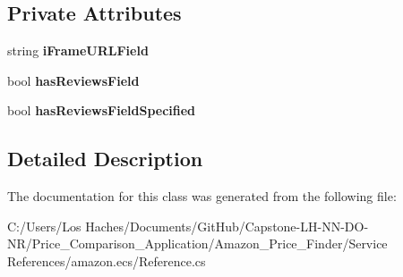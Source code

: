 \subsection*{Private Attributes}
\begin{DoxyCompactItemize}
\item 
\hypertarget{class_price___comparison_1_1amazon_1_1ecs_1_1_customer_reviews_a81e9665fb88758921a88d2580e7653d9}{string {\bfseries i\-Frame\-U\-R\-L\-Field}}\label{class_price___comparison_1_1amazon_1_1ecs_1_1_customer_reviews_a81e9665fb88758921a88d2580e7653d9}

\item 
\hypertarget{class_price___comparison_1_1amazon_1_1ecs_1_1_customer_reviews_a4f987e2d00f0114978ed875d49180ebc}{bool {\bfseries has\-Reviews\-Field}}\label{class_price___comparison_1_1amazon_1_1ecs_1_1_customer_reviews_a4f987e2d00f0114978ed875d49180ebc}

\item 
\hypertarget{class_price___comparison_1_1amazon_1_1ecs_1_1_customer_reviews_a1bcc1d483e48f2b9c808dc87b2161f62}{bool {\bfseries has\-Reviews\-Field\-Specified}}\label{class_price___comparison_1_1amazon_1_1ecs_1_1_customer_reviews_a1bcc1d483e48f2b9c808dc87b2161f62}

\end{DoxyCompactItemize}


\subsection{Detailed Description}


The documentation for this class was generated from the following file\-:\begin{DoxyCompactItemize}
\item 
C\-:/\-Users/\-Los Haches/\-Documents/\-Git\-Hub/\-Capstone-\/\-L\-H-\/\-N\-N-\/\-D\-O-\/\-N\-R/\-Price\-\_\-\-Comparison\-\_\-\-Application/\-Amazon\-\_\-\-Price\-\_\-\-Finder/\-Service References/amazon.\-ecs/Reference.\-cs\end{DoxyCompactItemize}
